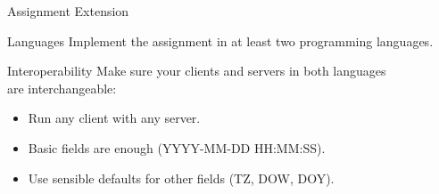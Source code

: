 \begin{frame}{Assignment Extension}
    \begin{block}{Languages}
        Implement the assignment in at least two programming languages.
    \end{block}

    \bigskip

    \begin{block}{Interoperability}
        Make sure your clients and servers in both languages \\ are interchangeable:
        \begin{itemize}
            \item Run any client with any server.
            \item Basic fields are enough (YYYY-MM-DD HH:MM:SS).
            \item Use sensible defaults for other fields (TZ, DOW, DOY).
        \end{itemize}
    \end{block}
\end{frame}
